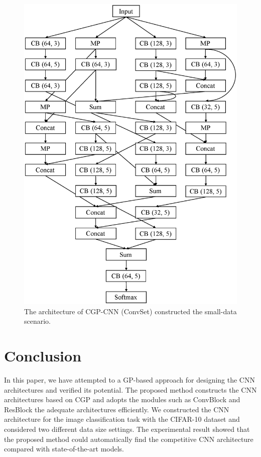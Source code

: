 \begin{figure}[t]
\includegraphics[width=0.9\linewidth]{images/model_small.eps}
\caption{The architecture of CGP-CNN (ConvSet) constructed  the small-data scenario.}
\label{model_small}
\end{figure}


\section{Conclusion}
In this paper, we have attempted to  a GP-based approach for designing the CNN architectures and  verified its potential.
The proposed method constructs the CNN architectures based on CGP and adopts the  modules\new{,} such as ConvBlock and ResBlock\new{,}  the adequate architectures efficiently.
We  constructed the CNN architecture for the image classification task with the CIFAR-10 dataset and considered two different data size settings. The experimental result showed that the proposed method could automatically find the competitive CNN architecture compared with  state-of-the-art models.

